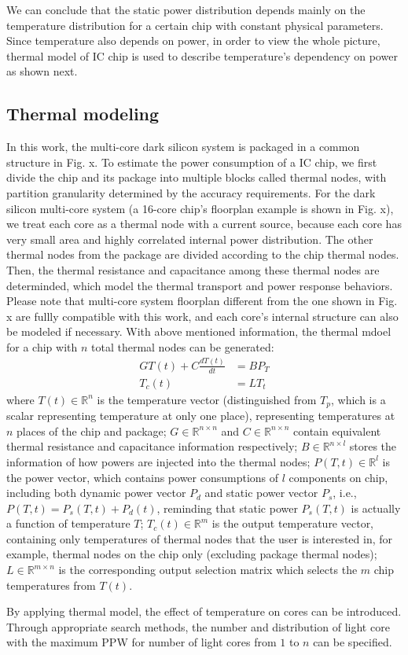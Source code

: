 We can conclude that the static power distribution depends mainly on
the temperature distribution
for a certain chip with constant physical parameters.
Since temperature also depends on power, in order to view the whole
picture, thermal model of IC chip is used to describe
temperature's dependency on power as shown next.


\subsection{Thermal modeling}
In this work, the multi-core dark silicon system is packaged in a common structure in Fig. x. 
To estimate the power consumption of a IC chip, we first divide the chip and its package into multiple blocks called thermal nodes, with partition granularity determined by the accuracy requirements. For the dark silicon multi-core system (a 16-core chip's floorplan example is shown in Fig. x), we treat each core as a thermal node with a current source, because each core has very small area and highly correlated internal power distribution. The other thermal nodes from the package are divided according to the chip thermal nodes. Then, the thermal resistance and capacitance among these thermal nodes are determinded, which model the thermal transport and power response behaviors. Please note that multi-core system floorplan different from the one shown in Fig. x are fullly compatible with this work, and each core's internal structure can also be modeled if necessary. With above mentioned information, the thermal mdoel for a chip with $n$ total thermal nodes can be generated:
\begin{equation}\label{gt=bp}
\begin{split}
GT(t) + C\frac{dT(t)}{dt} &= BP_{T}\\
T_{c}(t) &= LT_{t}
\end{split}
\end{equation}
where $T(t) \in \mathbb{R}^n$ is the temperature vector (distinguished from $T_p$, which is a scalar representing temperature at only one place), representing temperatures at $n$ places of the chip and package; $G \in \mathbb{R}^{n\times n}$ and  $C \in \mathbb{R}^{n \times n}$ contain equivalent thermal resistance and capacitance information respectively; $B \in \mathbb{R}^{n \times l}$ stores the information of how powers are injected into the thermal nodes; $P(T, t) \in \mathbb{R}^{l}$ is the power vector, which contains power consumptions of $l$ components on chip, including both dynamic power vector $P_d$ and static power vector $P_s$, i.e., $P(T, t)=P_s(T, t)+P_d(t)$, reminding that static power $P_s(T, t)$ is actually a function of temperature $T$;  $T_{c}(t) \in \mathbb{R}^m$ is the output temperature vector, containing only temperatures of thermal nodes that the user is interested in, for example, thermal nodes on the chip only (excluding package thermal nodes); $L \in \mathbb{R}^{m \times n}$ is the corresponding output selection matrix which selects the $m$ chip temperatures from $T(t)$.

By applying thermal model, the effect of temperature on cores can be introduced. Through appropriate search methods, the number and distribution of light core with the maximum PPW for number of light cores from $1$ to $n$ can be specified.




